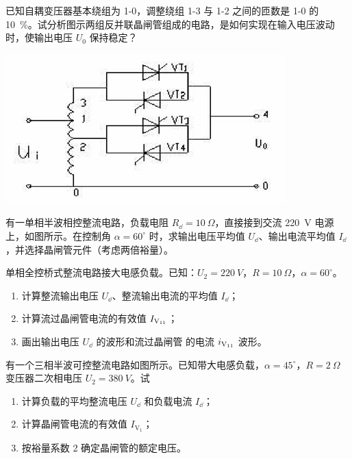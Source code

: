 \documentclass[电力电子]{subfiles}
\begin{document}
\begin{ti}[10 分]
	已知自耦变压器基本绕组为 1-0，调整绕组 1-3 与 1-2 之间的匝数是 1-0 的 \SI{10}{\percent}。试分析图示两组反并联晶闸管组成的电路，是如何实现在输入电压波动时，使输出电压 $U_{0}$ 保持稳定？
	\begin{center}
		\includegraphics[scale=0.5]{figure/fig5.png}
	\end{center}
\end{ti}

\begin{ti}[10 分]
	有一单相半波相控整流电路，负载电阻 $R_{\dd} = \SI{10}{\Omega}$，直接接到交流 \SI{220}{V} 电源上，如图所示。在控制角 $\alpha = 60^\circ$ 时，求输出电压平均值 $U_{\dd}$、输出电流平均值 $I_{\dd}$，并选择晶闸管元件（考虑两倍裕量）。
\end{ti}

\begin{ti}[10 分]
	单相全控桥式整流电路接大电感负载。已知：$U_{2} = \SI{220}{V}$，$R = \SI{10}{\Omega}$，$\alpha = 60^\circ$。
	\begin{enumerate}
		\item 计算整流输出电压 $U_{\dd}$、整流输出电流的平均值 $I_{\dd}$；
		\item 计算流过晶闸管电流的有效值 $I_{\text{V\textsubscript{11}}}$；
		\item 画出输出电压 $U_{\dd}$ 的波形和流过晶闸管 \V 的电流 $i_{\text{V\textsubscript{11}}}$ 波形。
	\end{enumerate}
\end{ti}

\begin{ti}[10 分]
	有一个三相半波可控整流电路如图所示。已知带大电感负载，$\alpha = 45^\circ$，$R = \SI{2}{\Omega}$ 变压器二次相电压 $U_{2} = \SI{380}{V}$。试
	\begin{enumerate}
		\item 计算负载的平均整流电压 $U_{\dd}$ 和负载电流 $I_{\dd}$；
		\item 计算晶闸管电流的有效值 $I_{\mathrm{V}_1}$；
		\item 按裕量系数 2 确定晶闸管的额定电压。
	\end{enumerate}
\end{ti}
\end{document}
